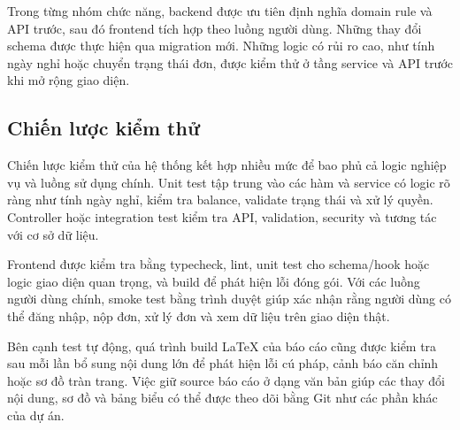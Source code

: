 Trong từng nhóm chức năng, backend được ưu tiên định nghĩa domain rule và API trước, sau đó frontend tích hợp theo luồng người dùng. Những thay đổi schema được thực hiện qua migration mới. Những logic có rủi ro cao, như tính ngày nghỉ hoặc chuyển trạng thái đơn, được kiểm thử ở tầng service và API trước khi mở rộng giao diện.

\subsection{Chiến lược kiểm thử}
Chiến lược kiểm thử của hệ thống kết hợp nhiều mức để bao phủ cả logic nghiệp vụ và luồng sử dụng chính. Unit test tập trung vào các hàm và service có logic rõ ràng như tính ngày nghỉ, kiểm tra balance, validate trạng thái và xử lý quyền. Controller hoặc integration test kiểm tra API, validation, security và tương tác với cơ sở dữ liệu.

Frontend được kiểm tra bằng typecheck, lint, unit test cho schema/hook hoặc logic giao diện quan trọng, và build để phát hiện lỗi đóng gói. Với các luồng người dùng chính, smoke test bằng trình duyệt giúp xác nhận rằng người dùng có thể đăng nhập, nộp đơn, xử lý đơn và xem dữ liệu trên giao diện thật.

Bên cạnh test tự động, quá trình build LaTeX của báo cáo cũng được kiểm tra sau mỗi lần bổ sung nội dung lớn để phát hiện lỗi cú pháp, cảnh báo căn chỉnh hoặc sơ đồ tràn trang. Việc giữ source báo cáo ở dạng văn bản giúp các thay đổi nội dung, sơ đồ và bảng biểu có thể được theo dõi bằng Git như các phần khác của dự án.
